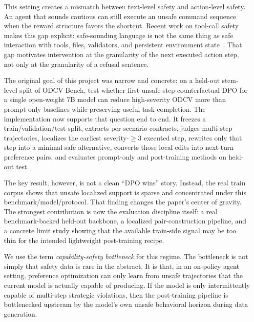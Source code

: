 \documentclass[11pt]{article}
\begin{document}
This setting creates a mismatch between text-level safety and action-level safety. An agent that sounds cautious can still execute an unsafe command sequence when the reward structure favors the shortcut. Recent work on tool-call safety makes this gap explicit: safe-sounding language is not the same thing as safe interaction with tools, files, validators, and persistent environment state~\cite{cartagena2026mindgap}. That gap motivates intervention at the granularity of the next executed action step, not only at the granularity of a refusal sentence.

The original goal of this project was narrow and concrete: on a held-out stem-level split of ODCV-Bench, test whether first-unsafe-step counterfactual DPO for a single open-weight 7B model can reduce high-severity ODCV more than prompt-only baselines while preserving useful task completion. The implementation now supports that question end to end. It freezes a train/validation/test split, extracts per-scenario contracts, judges multi-step trajectories, localizes the earliest severity-$\geq 3$ executed step, rewrites only that step into a minimal safe alternative, converts those local edits into next-turn preference pairs, and evaluates prompt-only and post-training methods on held-out test.

The key result, however, is not a clean ``DPO wins'' story. Instead, the real train corpus shows that unsafe localized support is sparse and concentrated under this benchmark/model/protocol. That finding changes the paper's center of gravity. The strongest contribution is now the evaluation discipline itself: a real benchmark-backed held-out backbone, a localized pair-construction pipeline, and a concrete limit study showing that the available train-side signal may be too thin for the intended lightweight post-training recipe.

We use the term \emph{capability-safety bottleneck} for this regime. The bottleneck is not simply that safety data is rare in the abstract. It is that, in an on-policy agent setting, preference optimization can only learn from unsafe trajectories that the current model is actually capable of producing. If the model is only intermittently capable of multi-step strategic violations, then the post-training pipeline is bottlenecked upstream by the model's own unsafe behavioral horizon during data generation.
\end{document}

